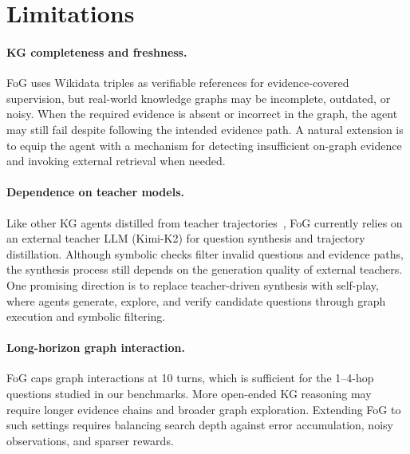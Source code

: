 \section*{Limitations}

\paragraph{KG completeness and freshness.}
FoG uses Wikidata triples as verifiable references for evidence-covered supervision, but real-world knowledge graphs may be incomplete, outdated, or noisy. When the required evidence is absent or incorrect in the graph, the agent may still fail despite following the intended evidence path. A natural extension is to equip the agent with a mechanism for detecting insufficient on-graph evidence and invoking external retrieval when needed.

\paragraph{Dependence on teacher models.}
Like other KG agents distilled from teacher trajectories~\citep{KnowCoder-A1,SoG-R1}, FoG currently relies on an external teacher LLM (Kimi-K2) for question synthesis and trajectory distillation. Although symbolic checks filter invalid questions and evidence paths, the synthesis process still depends on the generation quality of external teachers. One promising direction is to replace teacher-driven synthesis with self-play, where agents generate, explore, and verify candidate questions through graph execution and symbolic filtering.

\paragraph{Long-horizon graph interaction.}
FoG caps graph interactions at 10 turns, which is sufficient for the 1--4-hop questions studied in our benchmarks. More open-ended KG reasoning may require longer evidence chains and broader graph exploration. Extending FoG to such settings requires balancing search depth against error accumulation, noisy observations, and sparser rewards.
